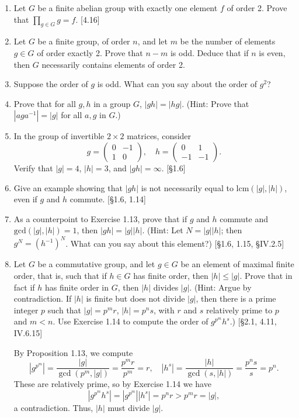 \begin{enumerate}
    \item Let $G$ be a finite abelian group with exactly one element $f$ of order 2. Prove that $\prod_{g \in G} g = f$. [4.16]

    \item Let $G$ be a finite group, of order $n$, and let $m$ be the number of elements $g \in G$ of order exactly 2. Prove that $n-m$ is odd. Deduce that if $n$ is even, then $G$ necessarily contains elements of order 2.

    \item Suppose the order of $g$ is odd. What can you say about the order of $g^2$?

    \item Prove that for all $g, h$ in a group $G$, $|gh| = |hg|$. (Hint: Prove that $|aga^{-1}| = |g|$ for all $a, g$ in $G$.)

    \item In the group of invertible $2 \times 2$ matrices, consider
          \[
              g = \begin{pmatrix} 0 & -1 \\ 1 & 0 \end{pmatrix}, \quad h = \begin{pmatrix} 0 & 1 \\ -1 & -1 \end{pmatrix}.
          \]
          Verify that $|g|=4$, $|h|=3$, and $|gh|=\infty$. [\S1.6]

    \item Give an example showing that $|gh|$ is not necessarily equal to $\text{lcm}(|g|,|h|)$, even if $g$ and $h$ commute. [\S1.6, 1.14]

    \item As a counterpoint to Exercise 1.13, prove that if $g$ and $h$ commute and $\text{gcd}(|g|, |h|) = 1$, then $|gh| = |g||h|$. (Hint: Let $N = |g||h|$; then $g^N = (h^{-1})^N$. What can you say about this element?) [\S1.6, 1.15, \S IV.2.5]

    \item Let $G$ be a commutative group, and let $g \in G$ be an element of maximal finite order, that is, such that if $h \in G$ has finite order, then $|h| \le |g|$. Prove that in fact if $h$ has finite order in $G$, then $|h|$ divides $|g|$. (Hint: Argue by contradiction. If $|h|$ is finite but does not divide $|g|$, then there is a prime integer $p$ such that $|g| = p^m r$, $|h| = p^n s$, with $r$ and $s$ relatively prime to $p$ and $m < n$. Use Exercise 1.14 to compute the order of $g^{p^m} h^s$.) [\S2.1, 4.11, IV.6.15]
    \begin{solution}
        By Proposition 1.13, we compute \[ |g^{p^m}| = \frac{|g|}{\gcd(p^m, |g|)} = \frac{p^m r}{p^m} = r, \quad |h^s| = \frac{|h|}{\gcd(s, |h|)} = \frac{p^n s}{s} = p^n. \]
        These are relatively prime, so by Exercise 1.14 we have \[ |g^{p^m} h^s| = |g^{p^m}||h^s| = p^n r > p^m r = |g|, \] a contradiction. Thus, $|h|$ must divide $|g|$.
    \end{solution}
\end{enumerate}
